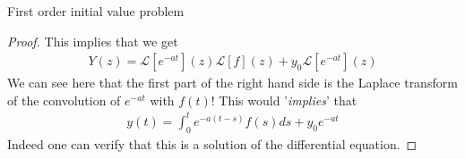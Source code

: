 \begin{parag}{First order initial value problem}
\begin{proof}
		This implies that we get 
		\begin{align*} 
			Y\left(z\right) =  \mathcal{L}\left[e^{-at}\right]\left(z\right)\mathcal{L}\left[f\right]\left(z\right) + y_0 \mathcal{L}\left[e^{-at}\right]\left(z\right)
		\end{align*}
		We can see here that the first part of the right hand side is the Laplace transform of the convolution of $e^{-at}$ with $f\left(t\right)$! This would '\textit{implies}' that 
		\begin{align*} 
			y\left(t\right) = \int_{0}^{t} e^{-a\left(t-s\right)}f\left(s\right)ds + y_0e^{-at}
		\end{align*}
		Indeed one can verify that this is a solution of the differential equation.
	\end{proof}
	
\end{parag}




